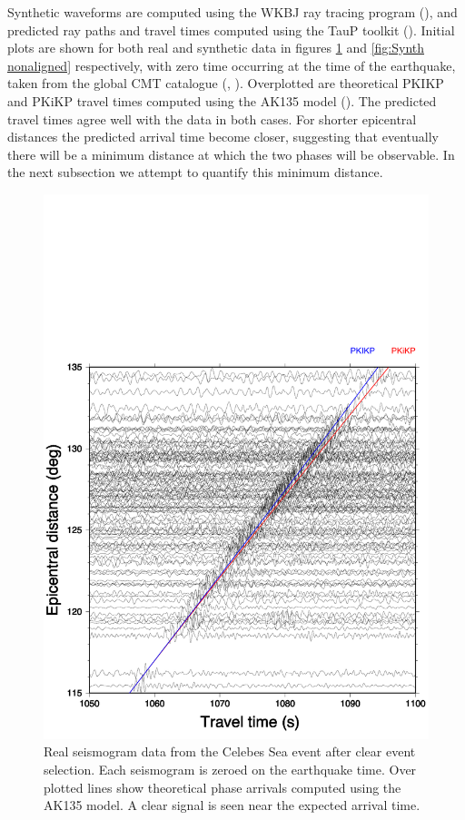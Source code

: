 \documentclass[11pt,a4paper]{article}
\begin{document}
Synthetic waveforms are computed using the WKBJ ray tracing program (\cite{Chapman1976}), and predicted ray paths and travel times computed using the TauP toolkit (\cite{Crotwell1999}). Initial plots are shown for both real and synthetic data in figures \ref{fig:Real nonaligned} and \ref{fig:Synth nonaligned} respectively, with zero time occurring at the time of the earthquake, taken from the global CMT catalogue (\cite{Dziewonski1981}, \cite{Alboussiere2012}). Overplotted are theoretical PKIKP and PKiKP travel times computed using the AK135 model (\cite{Kennett1995b}). The predicted travel times agree well with the data in both cases. For shorter epicentral distances the predicted arrival time become closer, suggesting that eventually there will be a minimum distance at which the two phases will be observable. In the next subsection we attempt to quantify this minimum distance.

\begin{figure}
	\includegraphics[width=\textwidth]{figures/celebessea_real.pdf}
	\caption{Real seismogram data from the Celebes Sea event after clear event selection. Each seismogram is zeroed on the earthquake time. Over plotted lines show theoretical phase arrivals computed using the AK135 model. A clear signal is seen near the expected arrival time.}
	\label{fig:Real nonaligned}
\end{figure}
\end{document}
